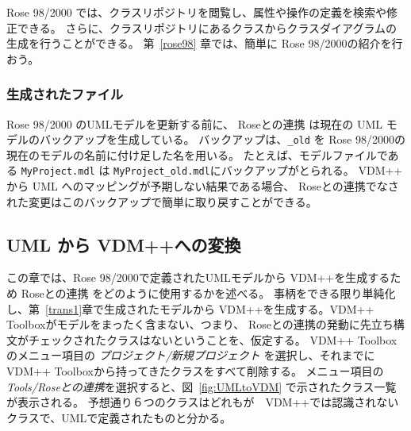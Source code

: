 \documentclass[\pformat,12pt]{jarticle}
\newcommand{\vdmpp}{VDM++}
\newcommand{\link}{Roseとの連携}
\newcommand{\rose}{Rose 98/2000}
\begin{document}
 \rose{} では、クラスリポジトリを閲覧し、属性や操作の定義を検索や修正できる。
 さらに、クラスリポジトリにあるクラスからクラスダイアグラムの生成を行うことができる。
第~\ref{rose98} 章では、簡単に \rose{}の紹介を行おう。

\subsubsection*{生成されたファイル}

\rose{} のUMLモデルを更新する前に、 \link{} は現在の UML モデルのバックアップを生成している。
バックアップは、{\tt \_old} を \rose{}の現在のモデルの名前に付け足した名を用いる。
たとえば、モデルファイルである {\tt MyProject.mdl} は {\tt  MyProject\_old.mdl}にバックアップがとられる。
\vdmpp{} から UML へのマッピングが予期しない結果である場合、 \link{}でなされた変更はこのバックアップで簡単に取り戻すことができる。


\subsection{UML から VDM++への変換　} \label{trans2}
   

この章では、\rose{}で定義されたUMLモデルから \vdmpp{}を生成するため \link{} をどのように使用するかを述べる。
事柄をできる限り単純化し、第~\ref{trans1}章で生成されたモデルから \vdmpp{}を生成する。\vdmpp{}　Toolboxがモデルをまったく含まない、つまり、 \link{}の発動に先立ち構文がチェックされたクラスはないということを、仮定する。
\vdmpp{} Toolboxのメニュー項目の {\it プロジェクト/新規プロジェクト} を選択し、それまでに\vdmpp{} Toolboxから持ってきたクラスをすべて削除する。
メニュー項目の {\it Tools/\link{}}を選択すると、図~\ref{fig:UMLtoVDM} で示されたクラス一覧が表示される。
予想通り６つのクラスはどれもが　\vdmpp{}では認識されないクラスで、UMLで定義されたものと分かる。
\end{document}
